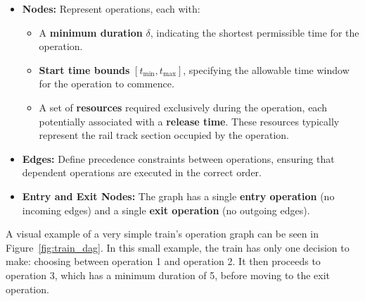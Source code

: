 \documentclass[runningheads]{llncs}
\begin{document}
\begin{itemize}
    \item \textbf{Nodes:} Represent operations, each with:
    \begin{itemize}
        \item A \textbf{minimum duration} $\delta$, indicating the shortest permissible time for the operation.
        \item \textbf{Start time bounds} $[t_{\text{min}}, t_{\text{max}}]$, specifying the allowable time window for the operation to commence.
        \item A set of \textbf{resources} required exclusively during the operation, each potentially associated with a \textbf{release time}. These resources typically represent the rail track section occupied by the operation.
    \end{itemize}
    \item \textbf{Edges:} Define precedence constraints between operations, ensuring that dependent operations are executed in the correct order.
    \item \textbf{Entry and Exit Nodes:} The graph has a single \textbf{entry operation} (no incoming edges) and a single \textbf{exit operation} (no outgoing edges).
\end{itemize}

A visual example of a very simple train's operation graph can be seen in Figure~\ref{fig:train_dag}.
In this small example, the train has only one decision to make: choosing between operation 1 and operation 2. 
It then proceeds to operation 3, which has a minimum duration of 5, before moving to the exit operation.
\end{document}

